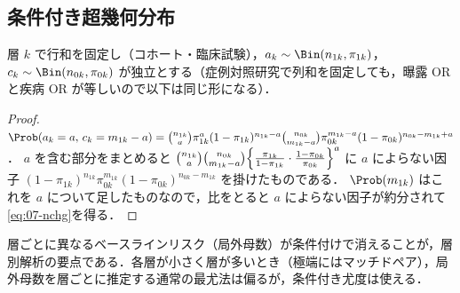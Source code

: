 \subsection{条件付き超幾何分布}\label{subsec:07-ncHG}
層 $k$ で行和を固定し（コホート・臨床試験），$a_k\sim\Bin(n_{1k},\pi_{1k})$，$c_k\sim\Bin(n_{0k},\pi_{0k})$ が独立とする（症例対照研究で列和を固定しても，曝露 OR と疾病 OR が等しいので以下は同じ形になる）．
\begin{proof}
$\Prob(a_k=a,\,c_k=m_{1k}-a)=\binom{n_{1k}}{a}\pi_{1k}^a(1-\pi_{1k})^{n_{1k}-a}\binom{n_{0k}}{m_{1k}-a}\pi_{0k}^{m_{1k}-a}(1-\pi_{0k})^{n_{0k}-m_{1k}+a}$．
$a$ を含む部分をまとめると $\binom{n_{1k}}{a}\binom{n_{0k}}{m_{1k}-a}\Bigl\{\frac{\pi_{1k}}{1-\pi_{1k}}\cdot\frac{1-\pi_{0k}}{\pi_{0k}}\Bigr\}^a$ に $a$ によらない因子
$(1-\pi_{1k})^{n_{1k}}\pi_{0k}^{m_{1k}}(1-\pi_{0k})^{n_{0k}-m_{1k}}$ を掛けたものである．
$\Prob(m_{1k})$ はこれを $a$ について足したものなので，比をとると $a$ によらない因子が約分されて\cref{eq:07-nchg}を得る．
\end{proof}
層ごとに異なるベースラインリスク（局外母数）が条件付けで消えることが，層別解析の要点である．各層が小さく層が多いとき（極端にはマッチドペア），局外母数を層ごとに推定する通常の最尤法は偏るが，条件付き尤度は使える．

